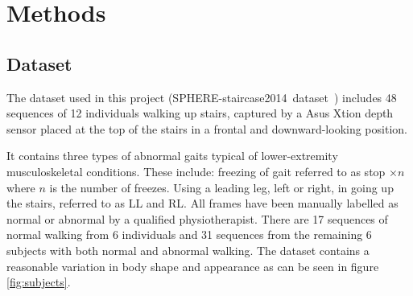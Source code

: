 \documentclass[11pt]{article} %
\begin{document}
\section{Methods}
\label{sec:methods}

\subsection{Dataset}
\label{sec:preprocessing}

The dataset used in this project (SPHERE-staircase2014~dataset~\cite{Paiement}) includes 48 sequences of 12 individuals walking up stairs, captured by a Asus Xtion depth sensor placed at the top of the stairs in a frontal and downward-looking position.

It contains three types of abnormal gaits typical of lower-extremity musculoskeletal conditions. These include: freezing of gait referred to as stop $\times n$ where $n$ is the number of freezes. Using a leading leg, left or right, in going up the stairs, referred to as LL and RL. All frames have been manually labelled as normal or abnormal by a qualified physiotherapist. There are 17 sequences of normal walking from 6 individuals and 31 sequences from the remaining 6 subjects with both normal and abnormal walking. The dataset contains a reasonable variation in body shape and appearance as can be seen in figure \ref{fig:subjects}.
\end{document}
